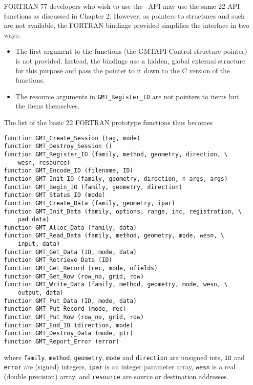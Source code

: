 \documentclass[11pt]{report}
\begin{document}
FORTRAN 77 developers who wish to use the \GMT\ API may use the same 22 API functions as discussed in Chapter 2.
However, as pointers to structures and such are not available, the FORTRAN bindings provided simplifies the
interface in two ways:
\begin{itemize}
\item The first argument to the functions (the GMTAPI Control structure pointer) is not provided.  Instead,
the bindings use a hidden, global external structure for this purpose and pass the pointer to it down to
the C version of the functions.
\item The resource arguments in \texttt{GMT\_Register\_IO} are not pointers to
items but the items themselves.
\end{itemize}
The list of the basic 22 FORTRAN prototype functions thus becomes
\begin{verbatim}
function GMT_Create_Session (tag, mode)
function GMT_Destroy_Session ()
function GMT_Register_IO (family, method, geometry, direction, \
    wesn, resource)
function GMT_Encode_ID (filename, ID)
function GMT_Init_IO (family, geometry, direction, n_args, args)
function GMT_Begin_IO (family, geometry, direction)
function GMT_Status_IO (mode)
function GMT_Create_Data (family, geometry, ipar)
function GMT_Init_Data (family, options, range, inc, registration, \
    pad data)
function GMT_Alloc_Data (family, data)
function GMT_Read_Data (family, method, geometry, mode, wesn, \
    input, data)
function GMT_Get_Data (ID, mode, data)
function GMT_Retrieve_Data (ID)
function GMT_Get_Record (rec, mode, nfields)
function GMT_Get_Row (row_no, grid, row)
function GMT_Write_Data (family, method, geometry, mode, wesn, \
    output, data)
function GMT_Put_Data (ID, mode, data)
function GMT_Put_Record (mode, rec)
function GMT_Put_Row (row_no, grid, row)
function GMT_End_IO (direction, mode)
function GMT_Destroy_Data (mode, ptr)
function GMT_Report_Error (error)
\end{verbatim}
where \texttt{family}, \texttt{method}, \texttt{geometry}, \texttt{mode} and \texttt{direction}
are unsigned ints, \texttt{ID} and \texttt{error} are (signed) integers,
\texttt{ipar} is an integer parameter array, \texttt{wesn} is a real (double precision) array,
and \texttt{resource} are source or destination addresses.

\clearpage
\printindex
\end{document}
